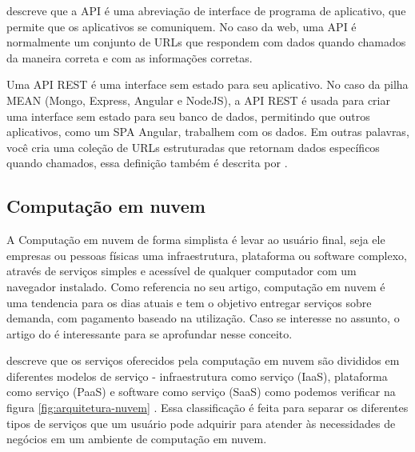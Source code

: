 \cite{Harber2019} descreve que a API é uma abreviação de interface de programa de aplicativo, que permite que os aplicativos se comuniquem. No caso da web, uma API é normalmente um conjunto de URLs que respondem com dados quando chamados da maneira correta e com as informações corretas.

Uma API REST é uma interface sem estado para seu aplicativo. No caso da pilha MEAN (Mongo, Express, Angular e NodeJS), a API REST é usada para criar uma interface sem estado para seu banco de dados, permitindo que outros aplicativos, como um SPA Angular, trabalhem com os dados. Em outras palavras, você cria uma coleção de URLs estruturadas que retornam dados específicos quando chamados, essa definição também é descrita por \cite{Harber2019}.


\subsection{Computação em nuvem}

A Computação em nuvem de forma simplista é levar ao usuário final, seja ele empresas ou pessoas físicas uma infraestrutura, plataforma ou software complexo, através de serviços simples e acessível de qualquer computador com um navegador instalado. Como \cite{Sousa2010} referencia no seu artigo, computação em nuvem é uma tendencia para os dias atuais e tem o objetivo entregar serviços sobre demanda, com pagamento baseado na utilização. Caso se interesse no assunto, o artigo do \cite{Sousa2010} é interessante para se aprofundar nesse conceito.

\cite{Hanjura2014} descreve que os serviços oferecidos pela computação em nuvem são divididos em diferentes modelos de serviço - infraestrutura como serviço (IaaS), plataforma como serviço (PaaS) e software como serviço (SaaS) como podemos verificar na figura \ref{fig:arquitetura-nuvem} . Essa classificação é feita para separar os diferentes tipos de serviços que um usuário pode adquirir para atender às necessidades de negócios em um ambiente de computação em nuvem.




